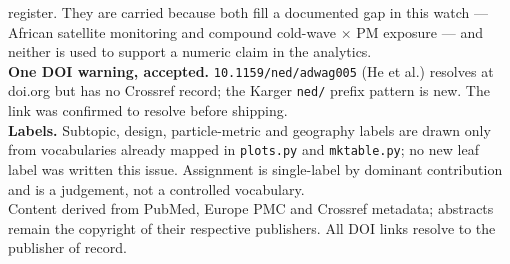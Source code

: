 \documentclass[10pt]{article}
\begin{document}
\begin{keybox}
{register. They are carried because both fill a documented gap in this watch --- African
satellite monitoring and compound cold-wave $\times$ PM exposure --- and neither is used to
support a numeric claim in the analytics.\\[0.8mm]
\textbf{One DOI warning, accepted.} \texttt{10.1159/ned/adwag005} (He et al.) resolves at
doi.org but has no Crossref record; the Karger \texttt{ned/} prefix pattern is new. The
link was confirmed to resolve before shipping.\\[0.8mm]
\textbf{Labels.} Subtopic, design, particle-metric and geography labels are drawn only
from vocabularies already mapped in \texttt{plots.py} and \texttt{mktable.py}; no new leaf
label was written this issue. Assignment is single-label by dominant contribution and is
a judgement, not a controlled vocabulary.\\[0.8mm]
Content derived from PubMed, Europe PMC and Crossref metadata; abstracts remain the
copyright of their respective publishers. All DOI links resolve to the publisher of
record.\par}
\end{keybox}
\end{document}
